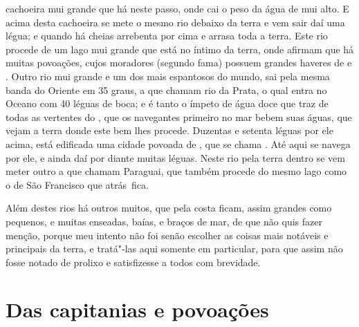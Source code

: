 cachoeira mui grande que há neste passo, onde cai o peso da água de mui
alto. E acima desta cachoeira se mete o mesmo rio debaixo da terra e
vem sair daí uma légua; e quando há cheias arrebenta por cima e arrasa
toda a terra. Este rio procede de um lago mui grande que está no íntimo
da terra, onde afirmam que há muitas povoações, cujos moradores
(segundo fama) possuem grandes haveres de  e . Outro rio
mui grande e um dos mais espantosos do mundo, sai pela mesma banda do
Oriente em 35 graus, a que chamam rio da Prata, o qual					%
entra no Oceano com 40 léguas de boca; e é tanto o ímpeto de água
doce que traz de todas as vertentes do , que os navegantes primeiro no mar
bebem suas águas, que vejam a terra donde este bem lhes procede.
Duzentas e setenta léguas por ele acima, está edificada uma cidade
povoada de , que se chama .  Até aqui se navega por
ele, e ainda daí  por diante muitas léguas. Neste rio pela terra dentro
se vem meter outro a que chamam Paraguai, que também procede do mesmo			%
lago como o de São Francisco que \mbox{atrás fica.}

Além destes rios há outros muitos, que pela costa ficam, assim grandes
como pequenos, e muitas enseadas, baías, e braços de mar, de que não
quis fazer menção, porque meu intento não foi senão escolher as coisas
mais notáveis e principais da terra, e tratá"-las aqui somente em
particular, para que assim não fosse notado de prolixo e satisfizesse a
todos com brevidade.									



\chapter[Das \indice{capitanias} e povoações]{Das capitanias e
povoações}



